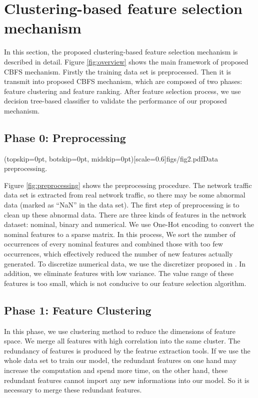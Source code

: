 \documentclass{ieeeaccess}
\theoremstyle{definition}
\begin{document}
\section{Clustering-based feature selection mechanism}
\label{sec:method}

In this section, the proposed clustering-based feature selection mechanism is described in detail. Figure \ref{fig:overview} shows the main framework of proposed CBFS mechanism. Firstly the training data set is preprocessed. Then it is transmit into proposed CBFS mechanism, which are composed of two phases: feature clustering and feature ranking. After feature selection process, we use decision tree-based classifier to validate the performance of our proposed mechanism.

\subsection{Phase 0: Preprocessing}

\Figure[!htpb](topskip=0pt, botskip=0pt, midskip=0pt)[scale=0.6]{figs/fig2.pdf}{Data preprocessing. \label{fig:preprocessing}}

Figure \ref{fig:preprocessing} shows the preprocessing procedure. The network traffic data set is extracted from real network traffic, so there may be some abnormal data (marked as ``NaN'' in the data set). The first step of preprocessing is to clean up these abnormal data. There are three kinds of features in the network dataset: nominal, binary and numerical. 
We use One-Hot encoding to convert the nominal features to a sparse matrix. 
In this process, We sort the number of occurrences of every nominal features and combined those with too few occurrences, which effectively reduced the number of new features actually generated. 
To discretize numerical data, we use the discretizer proposed in \cite{Mazumder2012}. 
In addition, we eliminate features with low variance. The value range of these features is too small, which is not conducive to our feature selection algorithm.

\subsection{Phase 1: Feature Clustering}

In this phase, we use clustering method to reduce the dimensions of feature space. 
We merge all features with high correlation into the same cluster.
The redundancy of features is produced by the featrue extraction tools. 
If we use the whole data set to train our model, the redundant features on one hand may increase the computation and spend more time, on the other hand, these redundant features cannot import any new informations into our model. 
So it is necessary to merge these redundant features. 
\end{document}
